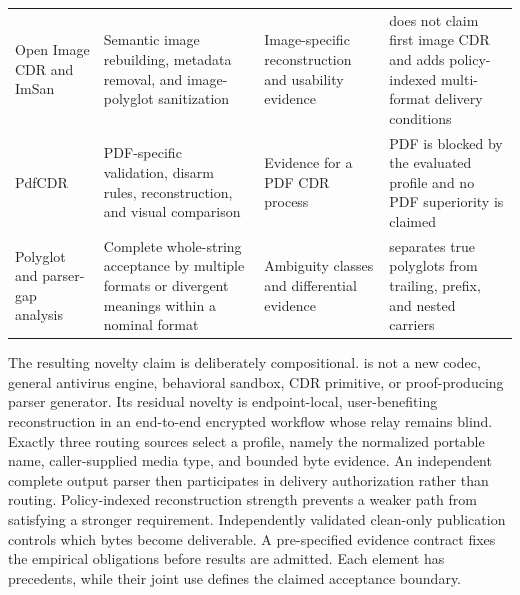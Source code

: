 \begin{longtable}{L{0.18\textwidth}L{0.19\textwidth}L{0.26\textwidth}L{0.27\textwidth}}
Open Image CDR and ImSan~\cite{belkind2023,koch2025} & Semantic image rebuilding, metadata removal, and image-polyglot sanitization & Image-specific reconstruction and usability evidence & \AFD{} does not claim first image CDR and adds policy-indexed multi-format delivery conditions \\
PdfCDR~\cite{dubin2023} & PDF-specific validation, disarm rules, reconstruction, and visual comparison & Evidence for a PDF CDR process & PDF is blocked by the evaluated \AFD{} profile and no PDF superiority is claimed \\
Polyglot and parser-gap analysis~\cite{koch2025,you2025} & Complete whole-string acceptance by multiple formats or divergent meanings within a nominal format & Ambiguity classes and differential evidence & \AFD{} separates true polyglots from trailing, prefix, and nested carriers \\
\end{longtable}
\endgroup

The resulting novelty claim is deliberately compositional. \AFD{} is not a new
codec, general antivirus engine, behavioral sandbox, CDR primitive, or
proof-producing parser generator. Its residual novelty is endpoint-local,
user-benefiting reconstruction in an end-to-end encrypted workflow whose relay
remains blind. Exactly three routing sources select a profile, namely the
normalized portable name, caller-supplied media type, and bounded byte evidence.
An independent complete output parser then participates in delivery
authorization rather than routing. Policy-indexed reconstruction strength
prevents a weaker path from satisfying a stronger requirement. Independently
validated clean-only publication controls which bytes become deliverable. A
pre-specified evidence contract fixes the empirical obligations before results
are admitted. Each element has precedents, while their joint use defines the
claimed acceptance boundary.
